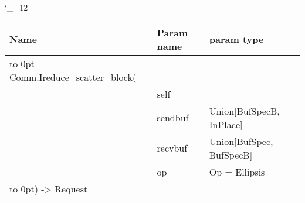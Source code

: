 \begingroup \catcode`\_=12 \tt
\begin{tabular}{lll}
\toprule
\textrm{Name}&\textrm{Param name}&\textrm{param type}\\
\midrule
\hbox to 0pt {Comm.Ireduce_scatter_block(\hss}\\
& self\\
& sendbuf & Union[BufSpecB, InPlace]\\
& recvbuf & Union[BufSpec, BufSpecB]\\
& op & Op = Ellipsis\\
\hbox to 0pt{) -> Request\hss}\\
\bottomrule
\end{tabular}
\endgroup

